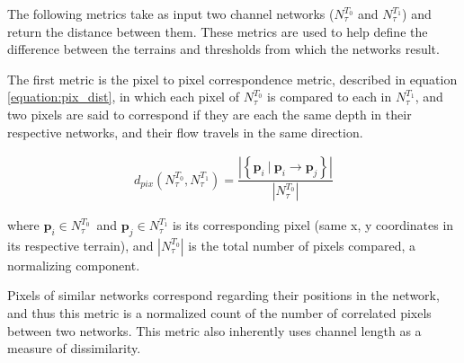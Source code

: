 The following metrics take as input two channel networks
($N^{T_{0}}_{\tau}$ and $N^{T_{1}}_{\tau}$) and return the distance between
them. These metrics are used to help define the difference between the
terrains and thresholds from which the networks result. 


The first metric is the pixel to pixel correspondence metric, described in equation \ref{equation:pix_dist}, in which
each pixel of $N^{T_{0}}_{\tau}$ is compared to each in $N^{T_{1}}_{\tau}$,
and two pixels are said to correspond if 
they are each the same depth in their respective networks,
and their flow travels in the same direction. 

\begin{align}
\label{equation:pix_dist}
  d_{pix} \left( N^{T_{0}}_{\tau}, N^{T_{1}}_{\tau} \right) = \dfrac{ \left| \left\{ \textbf{p}_{i} \  | \ \textbf{p}_{i} \rightarrow \textbf{p}_{j} \right\} \right| }{ \left| N^{T_{0}}_{\tau} \right|  }
\end{align}

\noindent where $\textbf{p}_{i} \in N^{T_{0}}_{\tau}\,$ and
$\textbf{p}_{j} \in N^{T_{1}}_{\tau}$ is its corresponding pixel (same x,
y coordinates in its respective terrain), and $\left| N^{T_{0}}_{\tau}
\right|$ is the total number of pixels compared, a normalizing
component.

Pixels of similar networks correspond regarding their positions in the network, and thus this metric is a normalized count of the number of correlated pixels between two networks. This metric also inherently uses channel length as a measure of dissimilarity.

